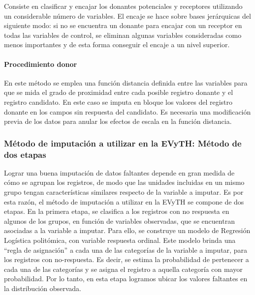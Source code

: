 \documentclass[
  openany]{book}
\begin{document}
Consiste en clasificar y encajar los donantes potenciales y receptores utilizando un considerable número de variables. El encaje se hace sobre bases jerárquicas del siguiente modo: si no se encuentra un donante para encajar con un receptor en todas las variables de control, se eliminan algunas variables consideradas como menos importantes y de esta forma conseguir el encaje a un nivel superior.

\hypertarget{procedimiento-donor}{%
\paragraph{Procedimiento donor}\label{procedimiento-donor}}

En este método se emplea una función distancia definida entre las variables para que se mida el grado de proximidad entre cada posible registro donante y el registro candidato. En este caso se imputa en bloque los valores del registro donante en los campos sin respuesta del candidato. Es necesaria una modificación previa de los datos para anular los efectos de escala en la función distancia.

\hypertarget{muxe9todo-de-imputaciuxf3n-a-utilizar-en-la-evyth-muxe9todo-de-dos-etapas}{%
\subsubsection{Método de imputación a utilizar en la EVyTH: Método de dos etapas}\label{muxe9todo-de-imputaciuxf3n-a-utilizar-en-la-evyth-muxe9todo-de-dos-etapas}}

Lograr una buena imputación de datos faltantes depende en gran medida de cómo se agrupan los registros, de modo que las unidades incluidas en un mismo grupo tengan características similares respecto de la variable a imputar. Es por esta razón, el método de imputación a utilizar en la EVyTH se compone de dos etapas. En la primera etapa, se clasifica a los registros con no respuesta en algunos de los grupos, en función de variables observadas, que se encuentran asociadas a la variable a imputar. Para ello, se construye un modelo de Regresión Logística politómica, con variable respuesta ordinal. Este modelo brinda una ``regla de asignación'' a cada una de las categorías de la variable a imputar, para los registros con no-respuesta. Es decir, se estima la probabilidad de pertenecer a cada una de las categorías y se asigna el registro a aquella categoría con mayor probabilidad. Por lo tanto, en esta etapa logramos ubicar los valores faltantes en la distribución observada.
\end{document}
